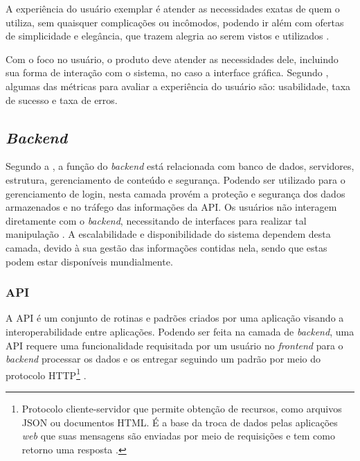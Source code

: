 A experiência do usuário exemplar é atender as necessidades exatas de quem o utiliza, sem quaisquer complicações ou incômodos, podendo ir além com ofertas de simplicidade e elegância, que trazem alegria ao serem vistos e utilizados \cite{NORMAN}. 


Com o foco no usuário, o produto deve atender as necessidades dele, incluindo sua forma de interação com o sistema, no caso a interface gráfica. Segundo , algumas das métricas para avaliar a experiência do usuário são: usabilidade, taxa de sucesso e taxa de erros.


\subsection{\textit{Backend}}
Segundo a , a função do \textit{backend} está relacionada com banco de dados, servidores, estrutura, gerenciamento de conteúdo e segurança. Podendo ser utilizado para o gerenciamento de login, nesta camada provém a proteção e segurança dos dados armazenados e no tráfego das informações da API. Os usuários não interagem diretamente com o \textit{backend}, necessitando de interfaces para realizar tal manipulação \cite{SOUTO}. A escalabilidade e disponibilidade do sistema dependem desta camada, devido à sua gestão das informações contidas nela, sendo que estas podem estar disponíveis mundialmente.

\subsubsection{API}
A API é um conjunto de rotinas e padrões criados por uma aplicação visando a interoperabilidade entre aplicações. Podendo ser feita na camada de \textit{backend}, uma API requere uma funcionalidade requisitada por um usuário no \textit{frontend} para o \textit{backend} processar os dados e os entregar seguindo um padrão por meio do protocolo HTTP\footnote{Protocolo cliente-servidor que permite obtenção de recursos, como arquivos JSON ou documentos HTML. É a base da troca de dados pelas aplicações \textit{web} que suas mensagens são enviadas por meio de requisições e tem como retorno uma resposta \cite{HTTP}.} \cite{BEECODE}.

